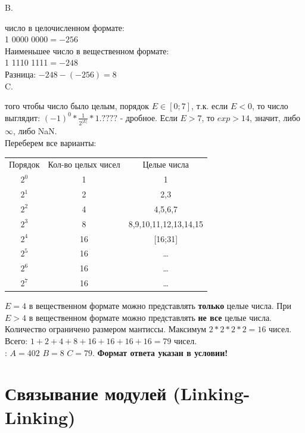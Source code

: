 \documentclass[12pt, letterpaper]{article}
\begin{document}
\setlength{\leftskip}{0cm}
\noindent B.

\setlength{\leftskip}{1cm}
 число в целочисленном формате:\\
1 0000 0000$ = -256$\\
Наименьшее число в вещественном формате:\\
1 1110 1111$ = -248$\\
Разница: $-248 - (-256) = 8$\\

\setlength{\leftskip}{0cm}
\noindent C.

\setlength{\leftskip}{1cm}
 того чтобы число было целым, порядок $E\in[0;7]$, т.к. если $E < 0$, то число выглядит: $(-1)^0 * \frac{1}{2^{|E|}} * 1.????$ - дробное. Если $E > 7$, то $exp > 14$, значит, либо $\infty$, либо NaN.\\
Переберем все варианты:\\
\begin{tabular}{|c|c|c|}
    \hline
    Порядок & Кол-во целых чисел & Целые числа\\
    $2^0$ & 1 & 1\\
    $2^1$ & 2 & 2,3\\
    $2^2$ & 4 & 4,5,6,7\\
    $2^3$ & 8 & 8,9,10,11,12,13,14,15\\
    $2^4$ & 16 & [16;31]\\
    $2^5$ & 16 & \dots\\
    $2^6$ & 16 & \dots\\
    $2^7$ & 16 & \dots\\
    \hline
\end{tabular}

 $E=4$ в вещественном формате можно представлять \textbf{только} целые числа. При $E>4$ в вещественном формате можно представлять \textbf{не все} целые числа. Количество ограничено размером мантиссы. Максимум $2*2*2*2 = 16$ чисел.\\
Всего: $1 + 2 + 4 + 8 + 16 + 16 + 16 + 16 = 79$ чисел.\\

\setlength{\leftskip}{0cm}
: $A=402$ $B=8$ $C=79$. \textbf{Формат ответа указан в условии!}
\newpage
\section{Связывание модулей (Linking-Linking)}
\end{document}

